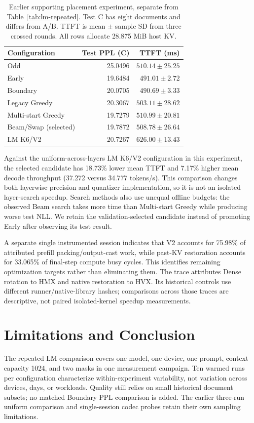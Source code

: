 \documentclass[conference,a4paper,10pt]{IEEEtran}
\begin{document}
\begin{table}[t]
\caption{Earlier supporting placement experiment, separate from Table~\ref{tab:lm-repeated}. Test C has eight documents and differs from A/B. TTFT is mean $\pm$ sample SD from three crossed rounds. All rows allocate 28.875 MiB host KV.}
\label{tab:allocation}
\centering
\setlength{\tabcolsep}{4pt}
\begin{tabular}{@{}lrr@{}}
\toprule
Configuration & Test PPL (C) & TTFT (ms)\\
\midrule
Odd & 25.0496 & $510.14\pm25.25$\\
Early & 19.6484 & $491.01\pm2.72$\\
Boundary & 20.0705 & $490.69\pm3.33$\\
Legacy Greedy & 20.3067 & $503.11\pm28.62$\\
Multi-start Greedy & 19.7279 & $510.99\pm20.81$\\
Beam/Swap (selected) & 19.7872 & $508.78\pm26.64$\\
LM K6/V2 & 20.7267 & $626.00\pm13.43$\\
\bottomrule
\end{tabular}
\end{table}

Against the uniform-across-layers LM K6/V2 configuration in this experiment, the selected candidate has 18.73\% lower mean TTFT and 7.17\% higher mean decode throughput (37.272 versus 34.777 tokens/s). This comparison changes both layerwise precision and quantizer implementation, so it is not an isolated layer-search speedup. Search methods also use unequal offline budgets: the observed Beam search takes more time than Multi-start Greedy while producing worse test NLL. We retain the validation-selected candidate instead of promoting Early after observing its test result.

A separate single instrumented session indicates that V2 accounts for 75.98\% of attributed prefill packing/output-cast work, while past-KV restoration accounts for 33.065\% of final-step compute busy cycles. This identifies remaining optimization targets rather than eliminating them. The trace attributes Dense rotation to HMX and native restoration to HVX. Its historical controls use different runner/native-library hashes; comparisons across those traces are descriptive, not paired isolated-kernel speedup measurements.

\section{Limitations and Conclusion}
The repeated LM comparison covers one model, one device, one prompt, context capacity 1024, and two masks in one measurement campaign. Ten warmed runs per configuration characterize within-experiment variability, not variation across devices, days, or workloads. Quality still relies on small historical document subsets; no matched Boundary PPL comparison is added. The earlier three-run uniform comparison and single-session codec probes retain their own sampling limitations.
\end{document}
